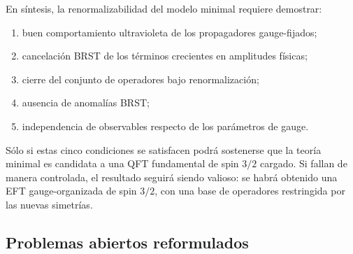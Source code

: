 \documentclass[11pt,a4paper]{article}
\numberwithin{equation}{section}
\begin{document}
En síntesis, la renormalizabilidad del modelo minimal requiere demostrar:
\begin{enumerate}[label=(\roman*)]
\item buen comportamiento ultravioleta de los propagadores gauge-fijados;
\item cancelación BRST de los términos crecientes en amplitudes físicas;
\item cierre del conjunto de operadores bajo renormalización;
\item ausencia de anomalías BRST;
\item independencia de observables respecto de los parámetros de gauge.
\end{enumerate}

Sólo si estas cinco condiciones se satisfacen podrá sostenerse que la teoría minimal es
candidata a una QFT fundamental de spin $3/2$ cargado. Si fallan de manera controlada,
el resultado seguirá siendo valioso: se habrá obtenido una EFT gauge-organizada de spin
$3/2$, con una base de operadores restringida por las nuevas simetrías.

\subsection{Problemas abiertos reformulados}
\label{subsec:problemas-abiertos-reformulados}
\end{document}
